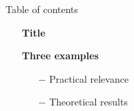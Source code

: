 \documentclass[../talk.tex]{subfiles}
\begin{document}
\begin{frame}{Table of contents}
    \begin{itemize}
        \item[] \textbf{Title}
        \item[] \textbf{Three examples}
                \begin{itemize}
                    \item[$-$] Practical relevance
                    \item[$-$] Theoretical results
                \end{itemize}
    \end{itemize}
\end{frame}
\end{document}
